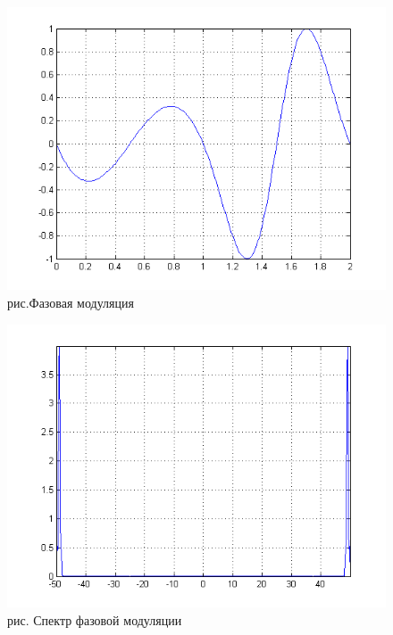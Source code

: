 \documentclass[10pt,a4paper]{report}
\begin{document}
\begin{figure}
\begin{center}
\includegraphics[width=150mm, scale = 0.9]{8_5}\newline
рис.Фазовая модуляция\newline
\end{center}
\end{figure}
\begin{figure}
\begin{center}
\includegraphics[width=150mm, scale = 0.9]{8_6}\newline
рис. Спектр фазовой модуляции\newline
\end{center}
\end{figure}
\end{document}
